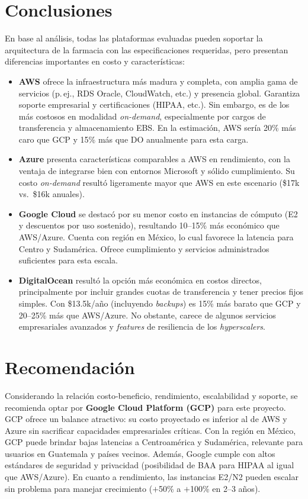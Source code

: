 \documentclass[12pt]{article}
\begin{document}
\section{Conclusiones}
En base al análisis, todas las plataformas evaluadas pueden soportar la arquitectura de la farmacia con las especificaciones requeridas, pero presentan diferencias importantes en costo y características:
\begin{itemize}
  \item \textbf{AWS} ofrece la infraestructura más madura y completa, con amplia gama de servicios (p.\,ej., RDS Oracle, CloudWatch, etc.) y presencia global. Garantiza soporte empresarial y certificaciones (HIPAA, etc.). Sin embargo, es de los más costosos en modalidad \emph{on-demand}, especialmente por cargos de transferencia y almacenamiento EBS. En la estimación, AWS sería 20\% más caro que GCP y 15\% más que DO anualmente para esta carga.
  \item \textbf{Azure} presenta características comparables a AWS en rendimiento, con la ventaja de integrarse bien con entornos Microsoft y sólido cumplimiento. Su costo \emph{on-demand} resultó ligeramente mayor que AWS en este escenario (\$17k vs.\ \$16k anuales).
  \item \textbf{Google Cloud} se destacó por su menor costo en instancias de cómputo (E2 y descuentos por uso sostenido), resultando 10--15\% más económico que AWS/Azure. Cuenta con región en México, lo cual favorece la latencia para Centro y Sudamérica. Ofrece cumplimiento y servicios administrados suficientes para esta escala.
  \item \textbf{DigitalOcean} resultó la opción más económica en costos directos, principalmente por incluir grandes cuotas de transferencia y tener precios fijos simples. Con \$13.5k/año (incluyendo \emph{backups}) es 15\% más barato que GCP y 20--25\% más que AWS/Azure. No obstante, carece de algunos servicios empresariales avanzados y \emph{features} de resiliencia de los \emph{hyperscalers}.
\end{itemize}

\section{Recomendación}
Considerando la relación costo-beneficio, rendimiento, escalabilidad y soporte, se recomienda optar por \textbf{Google Cloud Platform (GCP)} para este proyecto. GCP ofrece un balance atractivo: su costo proyectado es inferior al de AWS y Azure sin sacrificar capacidades empresariales críticas. Con la región en México, GCP puede brindar bajas latencias a Centroamérica y Sudamérica, relevante para usuarios en Guatemala y países vecinos. Además, Google cumple con altos estándares de seguridad y privacidad (posibilidad de BAA para HIPAA al igual que AWS/Azure). En cuanto a rendimiento, las instancias E2/N2 pueden escalar sin problema para manejar crecimiento (\(+\)50\% a \(+\)100\% en 2--3 años). 
\end{document}
